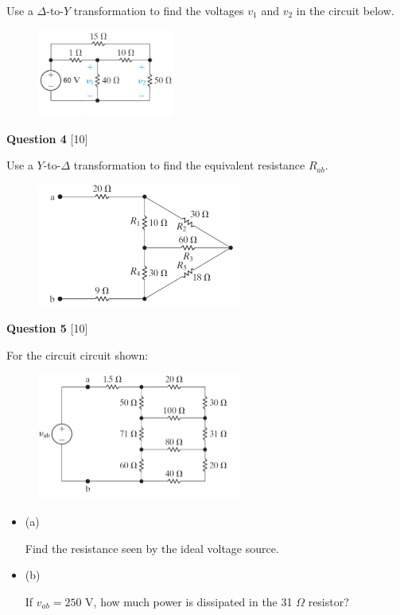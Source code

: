 \documentclass[12pt]{article}
\newcommand{\bit}{\begin{itemize}}
\newcommand{\eit}{\end{itemize}}
\begin{document}
Use a $\Delta$-to-$Y$ transformation to find the voltages $v_{1}$ and
$v_{2}$ in the circuit below. 

\begin{figure}[!h]
  \centering 
  \includegraphics[clip,width=0.4\textwidth]{Fig3-58.png}
\end{figure}

\vspace{0.1in}
\noindent
{\bf Question 4} [10]

Use a $Y$-to-$\Delta$ transformation to find the equivalent resistance
$R_{ab}$. 
\begin{figure}[h!]
  \centering 
  \includegraphics[clip,width=0.6\textwidth]{Fig3-61.png}
\end{figure}

\vspace{0.1in}
\noindent
{\bf Question 5} [10]

For the circuit circuit shown:
\begin{figure}[h!]
\centering 
\includegraphics[clip,width=0.6\textwidth]{Fig3-63.png}
\end{figure}
 \bit

\item[(a)]

Find the resistance seen by the ideal voltage source. 

\item[(b)]

If $v_{ab} = 250$ V, how much power is dissipated in the 31 $\Omega$ resistor?

\eit
\end{document}
